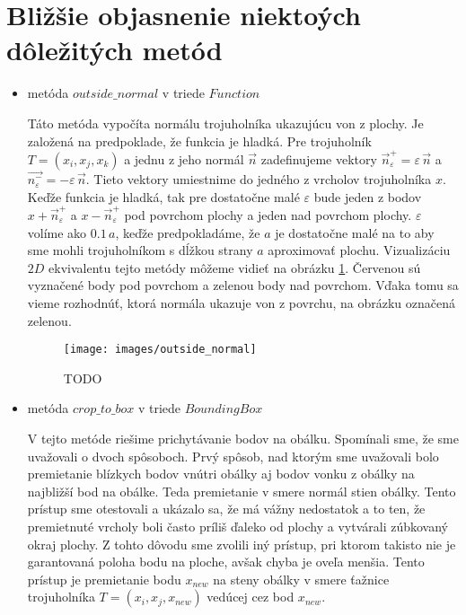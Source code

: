 \section{Bližšie objasnenie niektoých dôležitých metód}
\begin{itemize}
    \item{
        metóda $outside\_normal$ v triede $Function$
        
        Táto metóda vypočíta normálu trojuholníka ukazujúcu von z plochy.
        Je založená na predpoklade, že funkcia je hladká. Pre trojuholník
        $T = (x_i, x_j, x_k)$ a jednu z jeho normál $\overrightarrow{n}$
        zadefinujeme vektory $\overrightarrow{n}_{\varepsilon}^+ = \varepsilon \, \overrightarrow{n}$
        a $\overrightarrow{n_{\varepsilon}^-} = - \varepsilon \, \overrightarrow{n}$.
        Tieto vektory umiestnime do jedného z vrcholov trojuholníka $x$.
        Keďže funkcia je hladká, tak pre dostatočne malé $\varepsilon$ bude jeden z
        bodov $x + \overrightarrow{n}_{\varepsilon}^+$ a $x - \overrightarrow{n}_{\varepsilon}^+$ 
        pod povrchom plochy a jeden nad povrchom plochy. 
        $\varepsilon$ volíme ako $0.1 \, a$, keďže predpokladáme, že $a$ je dostatočne 
        malé na to aby sme mohli trojuholníkom s dĺžkou strany $a$ aproximovať plochu.
        Vizualizáciu $2D$ ekvivalentu tejto metódy môžeme vidieť na obrázku \ref{obr:outside_normal}.
        Červenou sú vyznačené body pod povrchom a zelenou body nad povrchom. Vďaka tomu sa vieme 
        rozhodnúť, ktorá normála ukazuje von z povrchu, na obrázku označená zelenou.

        \begin{figure}
            \centerline{\texttt{[image: images/outside\_normal]}}
            \caption[TODO]{TODO}
            \label{obr:outside_normal}
        \end{figure}
    }
    \item{

        metóda $crop\_to\_box$ v triede $BoundingBox$
        
        V tejto metóde riešime prichytávanie bodov na obálku.
        Spomínali sme, že sme uvažovali o dvoch spôsoboch.
        Prvý spôsob, nad ktorým sme uvažovali bolo premietanie blízkych bodov vnútri obálky aj 
        bodov vonku z obálky na najbližší bod na obálke. Teda premietanie v smere normál stien obálky.
        Tento prístup sme otestovali a ukázalo sa, že má vážny nedostatok a to ten, že premietnuté 
        vrcholy boli často príliš ďaleko od plochy a vytvárali zúbkovaný okraj plochy. Z tohto dôvodu
        sme zvolili iný prístup, pri ktorom takisto nie je garantovaná poloha bodu na ploche, avšak 
        chyba je oveľa menšia. Tento prístup je premietanie bodu $x_{new}$ na steny obálky v smere 
        ťažnice trojuholníka $T = (x_i, x_j, x_{new})$ vedúcej cez bod $x_{new}$.

}
\end{itemize}
